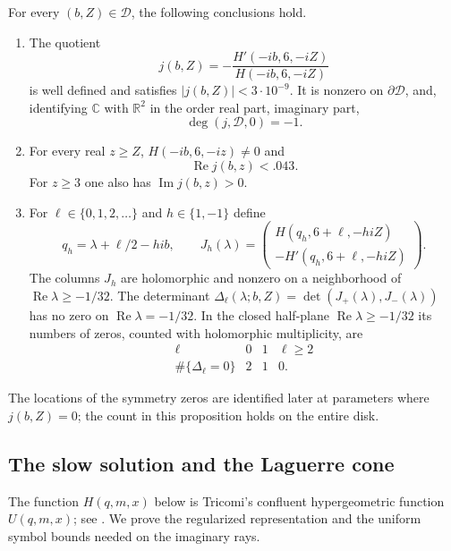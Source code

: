 \begin{proposition}\label{free:main}
For every $(b,Z)\in\mathcal D$, the following conclusions hold.
\begin{enumerate}
\item The quotient
\[
 j(b,Z)=-\frac{H'(-ib,6,-iZ)}{H(-ib,6,-iZ)}
\]
is well defined and satisfies $|j(b,Z)|<3\cdot10^{-9}$.  It is nonzero on
$\partial\mathcal D$, and, identifying $\mathbb C$ with $\mathbb R^2$ in the
order real part, imaginary part,
\[
 \deg(j,\mathcal D,0)=-1.
\]
\item For every real $z\ge Z$, $H(-ib,6,-iz)\ne0$ and
\begin{equation}\label{free:exterior-bounds}
 \operatorname{Re}j(b,z)<.043.
\end{equation}
For $z\ge3$ one also has $\operatorname{Im}j(b,z)>0$.
\item For $\ell\in\{0,1,2,\ldots\}$ and $h\in\{1,-1\}$ define
\begin{equation}\label{free:jet}
 q_h=\lambda+\ell/2-hi b,\qquad
 J_h(\lambda)=
 \begin{pmatrix}H(q_h,6+\ell,-hiZ)\\-H'(q_h,6+\ell,-hiZ)\end{pmatrix}.
\end{equation}
The columns $J_h$ are holomorphic and nonzero on a neighborhood of
$\operatorname{Re}\lambda\ge-1/32$.  The determinant
$\Delta_\ell(\lambda;b,Z)=\det(J_+(\lambda),J_-(\lambda))$ has no zero on
$\operatorname{Re}\lambda=-1/32$.  In the closed half-plane
$\operatorname{Re}\lambda\ge-1/32$ its numbers of zeros, counted with
holomorphic multiplicity, are
\[
 \begin{array}{c|ccc}
 \ell&0&1&\ell\ge2\\ \hline
 \#\{\Delta_\ell=0\}&2&1&0.
 \end{array}
\]
\end{enumerate}
The locations of the symmetry zeros are identified later at parameters
where $j(b,Z)=0$; the count in this proposition holds on the entire disk.
\end{proposition}

\subsection{The slow solution and the Laguerre cone}

The function $H(q,m,x)$ below is Tricomi's confluent hypergeometric
function $U(q,m,x)$; see \cite[Equations~13.4.4 and~13.3.22]{DLMF}.
We prove the regularized representation and the uniform symbol bounds
needed on the imaginary rays.

